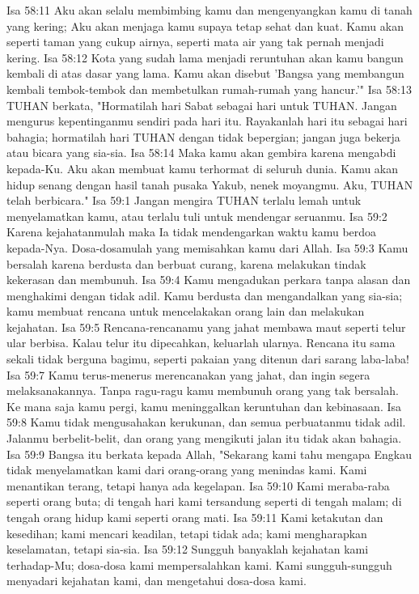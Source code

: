 Isa 58:11  Aku akan selalu membimbing kamu dan mengenyangkan kamu di tanah yang kering; Aku akan menjaga kamu supaya tetap sehat dan kuat. Kamu akan seperti taman yang cukup airnya, seperti mata air yang tak pernah menjadi kering.
Isa 58:12  Kota yang sudah lama menjadi reruntuhan akan kamu bangun kembali di atas dasar yang lama. Kamu akan disebut 'Bangsa yang membangun kembali tembok-tembok dan membetulkan rumah-rumah yang hancur.'"
Isa 58:13  TUHAN berkata, "Hormatilah hari Sabat sebagai hari untuk TUHAN. Jangan mengurus kepentinganmu sendiri pada hari itu. Rayakanlah hari itu sebagai hari bahagia; hormatilah hari TUHAN dengan tidak bepergian; jangan juga bekerja atau bicara yang sia-sia.
Isa 58:14  Maka kamu akan gembira karena mengabdi kepada-Ku. Aku akan membuat kamu terhormat di seluruh dunia. Kamu akan hidup senang dengan hasil tanah pusaka Yakub, nenek moyangmu. Aku, TUHAN telah berbicara."
Isa 59:1  Jangan mengira TUHAN terlalu lemah untuk menyelamatkan kamu, atau terlalu tuli untuk mendengar seruanmu.
Isa 59:2  Karena kejahatanmulah maka Ia tidak mendengarkan waktu kamu berdoa kepada-Nya. Dosa-dosamulah yang memisahkan kamu dari Allah.
Isa 59:3  Kamu bersalah karena berdusta dan berbuat curang, karena melakukan tindak kekerasan dan membunuh.
Isa 59:4  Kamu mengadukan perkara tanpa alasan dan menghakimi dengan tidak adil. Kamu berdusta dan mengandalkan yang sia-sia; kamu membuat rencana untuk mencelakakan orang lain dan melakukan kejahatan.
Isa 59:5  Rencana-rencanamu yang jahat membawa maut seperti telur ular berbisa. Kalau telur itu dipecahkan, keluarlah ularnya. Rencana itu sama sekali tidak berguna bagimu, seperti pakaian yang ditenun dari sarang laba-laba!
Isa 59:7  Kamu terus-menerus merencanakan yang jahat, dan ingin segera melaksanakannya. Tanpa ragu-ragu kamu membunuh orang yang tak bersalah. Ke mana saja kamu pergi, kamu meninggalkan keruntuhan dan kebinasaan.
Isa 59:8  Kamu tidak mengusahakan kerukunan, dan semua perbuatanmu tidak adil. Jalanmu berbelit-belit, dan orang yang mengikuti jalan itu tidak akan bahagia.
Isa 59:9  Bangsa itu berkata kepada Allah, "Sekarang kami tahu mengapa Engkau tidak menyelamatkan kami dari orang-orang yang menindas kami. Kami menantikan terang, tetapi hanya ada kegelapan.
Isa 59:10  Kami meraba-raba seperti orang buta; di tengah hari kami tersandung seperti di tengah malam; di tengah orang hidup kami seperti orang mati.
Isa 59:11  Kami ketakutan dan kesedihan; kami mencari keadilan, tetapi tidak ada; kami mengharapkan keselamatan, tetapi sia-sia.
Isa 59:12  Sungguh banyaklah kejahatan kami terhadap-Mu; dosa-dosa kami mempersalahkan kami. Kami sungguh-sungguh menyadari kejahatan kami, dan mengetahui dosa-dosa kami.
